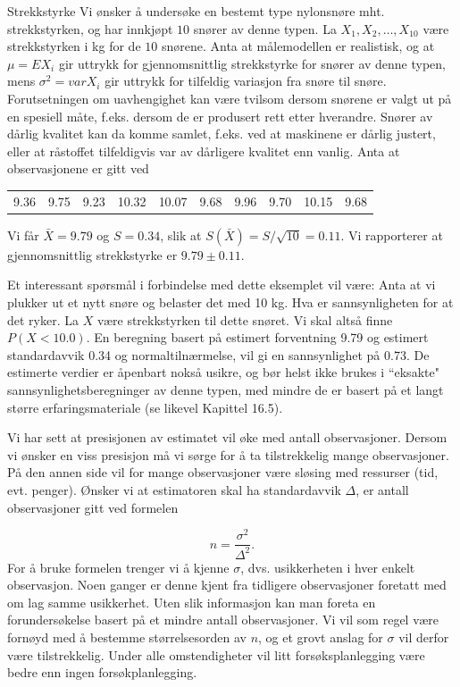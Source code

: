 \begin{eksempel}{Strekkstyrke}
Vi ønsker å undersøke en bestemt type nylonsnøre mht.
strekkstyrken, og har innkjøpt $10$ snører av
denne typen. La $X_1,X_2,\ldots ,X_{10}$ være strekk\-styrken i kg
for de $10$ snørene. Anta at målemodellen er realistisk,
og at $\mu =EX_i$ gir uttrykk for gjennomsnittlig strekkstyrke for
snører av denne typen, mens $\sigma ^2=varX_i$ gir uttrykk for
tilfeldig variasjon fra snøre til snøre. Forutsetningen om
uavhengighet kan være tvilsom dersom snørene er valgt ut
på en spesiell måte, f.eks. dersom de er produsert rett
etter hverandre. Snører av dårlig kvalitet kan da komme
samlet, f.eks. ved at maskinene er dårlig justert, eller at
råstoffet tilfeldigvis var av dårligere kvalitet enn vanlig.
Anta at observasjonene er gitt ved
\begin{center}
\begin{tabular}{cccccccccc}
   9.36&9.75&9.23&10.32&10.07&9.68&9.96&9.70&10.15&9.68
\end{tabular}
\end{center}
Vi får $\bar X=9.79$ og $S=0.34$, slik at $S(\bar X)=S/\sqrt{10}=0.11$.
Vi rapporterer at gjennomsnittlig strekkstyrke er
$9.79\pm 0.11$.
\end{eksempel}

Et interessant spørsmål i forbindelse med dette eksemplet
vil være: Anta at vi plukker ut et nytt snøre og belaster
det med 10 kg. Hva er sannsynligheten for at det ryker. La $X$
være strekkstyrken til dette snøret. Vi skal altså finne
$P(X < 10.0)$. En beregning basert på estimert forventning  9.79
og estimert standardavvik 0.34 og normaltilnærmelse, vil gi en
sannsynlighet på 0.73. De estimerte verdier er åpenbart
nokså usikre, og bør helst ikke brukes i ``eksakte" 
sannsynlighetsberegninger av denne typen, med mindre de er basert på 
et langt større erfaringsmateriale (se likevel Kapittel 16.5).

Vi har sett at presisjonen av estimatet vil øke med antall
observasjoner. Dersom vi ønsker en viss presisjon må vi
sørge for å ta tilstrekkelig mange observasjoner. På
den annen side vil for mange observasjoner være sløsing
med ressurser (tid, evt. penger). Ønsker vi at estimatoren
skal ha stan\-dard\-avvik $\Delta$, er antall observasjoner gitt ved
formelen

\[   n=\frac{\sigma ^2}{\Delta ^2}. \]
For å bruke formelen trenger vi å kjenne $\sigma$, dvs.
usikkerheten i hver enkelt observasjon. Noen ganger er denne
kjent fra tidligere observasjoner foretatt med om lag samme
usikkerhet. Uten slik informasjon kan man foreta en
forundersøkelse basert på et mindre antall observasjoner.
Vi vil som regel være fornøyd med å bestemme
størrelsesorden av $n$, og et grovt anslag for $\sigma$ vil
derfor være tilstrekkelig. Under alle omstendigheter vil litt
forsøksplanlegging være bedre enn ingen
forsøkplanlegging.

